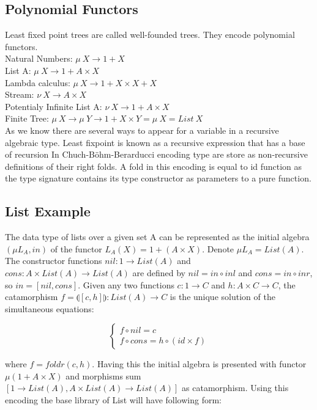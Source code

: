 \documentclass{aip-cp}
\begin{document}
\subsection{Polynomial Functors}
Least fixed point trees are called well-founded trees.
They encode polynomial functors.\\

\noindent Natural Numbers: $\mu\ X \rightarrow 1 + X$\\
List A: $\mu\ X \rightarrow 1 + A \times X$\\
Lambda calculus: $\mu\ X \rightarrow 1 + X \times X + X$\\
Stream: $\nu\ X \rightarrow A \times X$\\
Potentialy Infinite List A: $\nu\ X \rightarrow 1 + A \times X$\\
Finite Tree: $\mu\ X \rightarrow \mu\ Y \rightarrow 1 + X \times Y = \mu\ X = List\ X$\\

As we know there are several ways to appear for a variable in a recursive algebraic type.
Least fixpoint is known as a recursive expression that has a base of recursion
In Chuch-Böhm-Berarducci encoding type are store as non-recursive definitions
of their right folds. A fold in this encoding is equal to id function as the type
signature contains its type constructor as parameters to a pure function.

\subsection{List Example}
The data type of lists over a given set A can be represented as the initial algebra
$(\mu L_A, in)$ of the functor $L_A(X) = 1 + (A \times X)$. Denote $\mu L_A = List(A)$.
The constructor functions $nil: 1 \rightarrow List(A)$ and
$cons: A \times List(A) \rightarrow List(A)$ are defined by
$nil = in \circ inl$ and $cons = in \circ inr$, so $in = [nil,cons]$.
Given any two functions $c: 1 \rightarrow C$ and $h: A \times C \rightarrow C$,
the catamorphism $f = \llparenthesis [c,h] \rrparenthesis : List(A) \rightarrow C$
is the unique solution of the simultaneous equations:

$$
\begin{cases}
  f \circ nil  = c \\
  f \circ cons = h \circ (id \times f)
\end{cases}
$$

where $f = foldr(c,h)$. Having this the initial algebra is presented with functor
$\mu (1 + A \times X)$ and morphisms sum $[1 \rightarrow List(A), A \times List(A) \rightarrow List(A)]$
as catamorphism. Using this encoding the base library of List will have following form:
\end{document}

